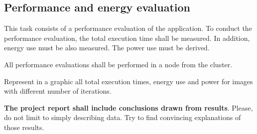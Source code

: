 \subsection{Performance and energy evaluation}

This task consists of a performance evaluation of the application.
To conduct the performance evaluation, the total execution time shall be measured.
In addition, energy use must be also measured.
The power use must be derived.

All performance evaluations shall be performed in a node from the
 cluster.

Represent in a graphic all total execution times, energy use and power
for images with different number of iterations.

\textbf{The project report shall include conclusions drawn from results}.
Please, do not limit to simply describing data.
Try to find convincing explanations of those results.

